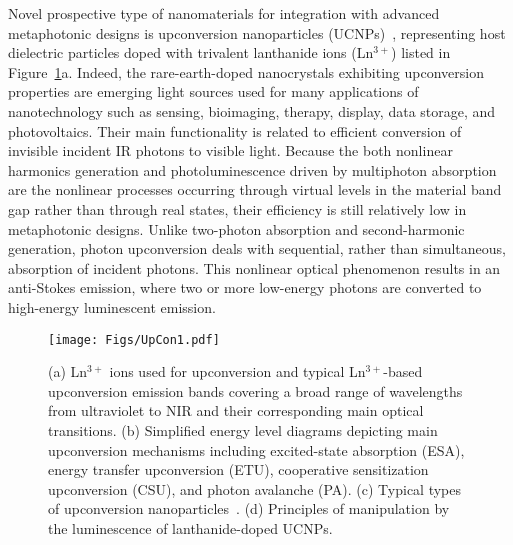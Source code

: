 \documentclass[journal=chreay,manuscript=review]{achemso}
\begin{document}
Novel prospective type of nanomaterials for integration with advanced metaphotonic designs is upconversion nanoparticles (UCNPs)~\cite{zhou2015controlling,marin2020doping}, representing host dielectric particles doped with trivalent lanthanide ions (Ln$^{3+}$) listed in Figure~\ref{fig:upcon1}a.
Indeed, the rare-earth-doped nanocrystals exhibiting upconversion properties are emerging light sources used for many applications of nanotechnology
such as sensing, bioimaging, therapy, display, data storage, and photovoltaics. 
Their main functionality is related to efficient conversion of invisible incident IR photons to visible light. Because the both nonlinear harmonics generation and photoluminescence driven by multiphoton absorption are the nonlinear processes occurring through virtual levels in the material band gap rather than through real states, their efficiency is still relatively low in metaphotonic designs.
Unlike two-photon absorption and second-harmonic generation, photon upconversion deals with sequential, rather than simultaneous, absorption of incident photons. This nonlinear optical phenomenon results in an anti-Stokes emission, where two or more low-energy photons are converted to high-energy luminescent emission. 

\begin{figure}[b!]
    \centering
    \texttt{[image: Figs/UpCon1.pdf]}
    \caption{
    (a) Ln$^{3+}$ ions used for upconversion and typical Ln$^{3+}$-based upconversion emission bands covering a broad range of wavelengths from ultraviolet to NIR and their corresponding main optical transitions. (b) Simplified energy level diagrams depicting main upconversion mechanisms including excited-state absorption (ESA), energy transfer upconversion (ETU), cooperative sensitization upconversion (CSU), and photon avalanche (PA). (c) Typical types of upconversion nanoparticles~\cite{liu2013lanthanide, fan2019exploiting}. (d) Principles of manipulation by the luminescence of lanthanide-doped UCNPs.}
    \label{fig:upcon1}
\end{figure}
\end{document}
